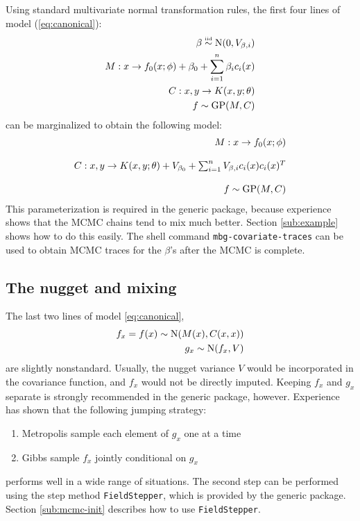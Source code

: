Using standard multivariate normal transformation rules, the first four lines of model (\ref{eq:canonical}):
\begin{eqnarray*}
    \beta \stackrel{\textup{\tiny iid}}{\sim} \textup{N}(0,V_{\beta,i}) \\
    M:x\rightarrow f_0(x;\phi)+\beta_0 + \sum_{i=1}^n \beta_i c_i(x)\\
    C:x,y\rightarrow K(x,y;\theta)\\
    f \sim \textup{GP}(M,C)
\end{eqnarray*}
can be marginalized to obtain the following model:
\begin{equation}
    \label{eq:int-covariates} 
    \begin{array}{r}
    M:x\rightarrow f_0(x;\phi)\\\\
    C:x,y\rightarrow K(x,y;\theta) + V_{\beta_0} + \sum_{i=1}^n V_{\beta,i}c_i(x)c_i(x)^T\\\\
    f\sim\textup{GP}(M,C)
    \end{array}
\end{equation}
This parameterization is required in the generic package, because experience shows that the MCMC chains tend to mix much better. Section \ref{sub:example} shows how to do this easily. The shell command \texttt{mbg-covariate-traces} can be used to obtain MCMC traces for the $\beta$'s after the MCMC is complete.

\subsection{The nugget and mixing}

The last two lines of model \ref{eq:canonical},
\begin{eqnarray*}
    f_x = f(x) \sim \textup{N}(M(x), C(x,x))\\
    g_x \sim \textup{N}(f_x, V)
\end{eqnarray*}
are slightly nonstandard. Usually, the nugget variance $V$ would be incorporated in the covariance function, and $f_x$ would not be directly imputed. Keeping $f_x$ and $g_x$ separate is strongly recommended in the generic package, however. Experience has shown that the following jumping strategy:
\begin{enumerate}
    \item Metropolis sample each element of $g_x$ one at a time
    \item Gibbs sample $f_x$ jointly conditional on $g_x$
\end{enumerate}
performs well in a wide range of situations. The second step can be performed using the step method \texttt{FieldStepper}, which is provided by the generic package. Section \ref{sub:mcmc-init} describes how to use \texttt{FieldStepper}. 

